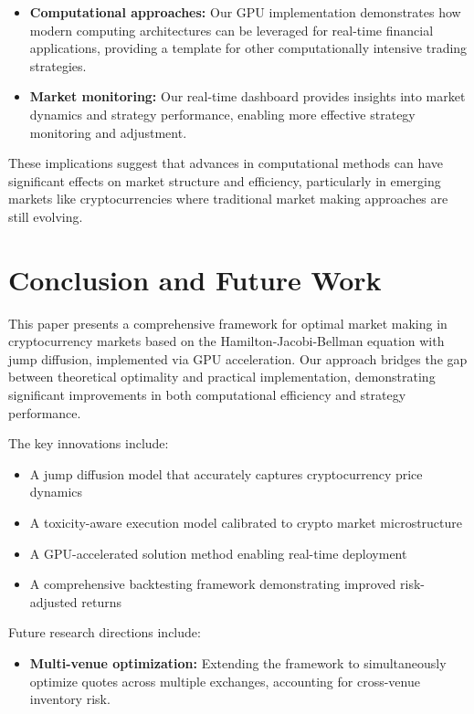 \documentclass[onecolumn,ieee]{arithmaxresearch}
\begin{document}
\begin{twocolumn}
\begin{itemize}
    \item \textbf{Computational approaches:} Our GPU implementation demonstrates how modern computing architectures can be leveraged for real-time financial applications, providing a template for other computationally intensive trading strategies.
    
    \item \textbf{Market monitoring:} Our real-time dashboard provides insights into market dynamics and strategy performance, enabling more effective strategy monitoring and adjustment.
\end{itemize}

These implications suggest that advances in computational methods can have significant effects on market structure and efficiency, particularly in emerging markets like cryptocurrencies where traditional market making approaches are still evolving.

\section{Conclusion and Future Work}

This paper presents a comprehensive framework for optimal market making in cryptocurrency markets based on the Hamilton-Jacobi-Bellman equation with jump diffusion, implemented via GPU acceleration. Our approach bridges the gap between theoretical optimality and practical implementation, demonstrating significant improvements in both computational efficiency and strategy performance.

The key innovations include:
\begin{itemize}
    \item A jump diffusion model that accurately captures cryptocurrency price dynamics
    \item A toxicity-aware execution model calibrated to crypto market microstructure
    \item A GPU-accelerated solution method enabling real-time deployment
    \item A comprehensive backtesting framework demonstrating improved risk-adjusted returns
\end{itemize}

Future research directions include:

\begin{itemize}
    \item \textbf{Multi-venue optimization:} Extending the framework to simultaneously optimize quotes across multiple exchanges, accounting for cross-venue inventory risk.
    

\end{itemize}
\end{twocolumn}
\end{document}
